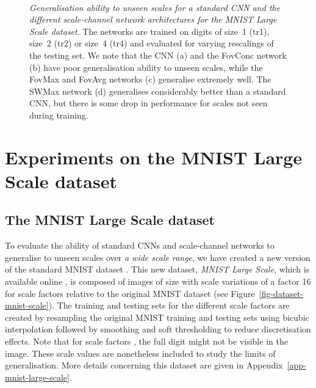 \documentclass[twocolumn,runningheads]{svjour3}
\begin{document}
\begin{figure*}[h]
	\centering
 \\
\vspace*{-1em}
	\caption{{\em Generalisation ability to unseen scales for a
            standard CNN and the different scale-channel network
            architectures for the MNIST Large Scale dataset\/}. The networks are trained on digits of
          size~1 (tr1), size~2 (tr2) or size~4 (tr4) and evaluated
          for varying rescalings of the testing set. We note that the CNN
          (a) and the FovConc network (b) have poor generalisation
          ability to unseen scales, while the FovMax and FovAvg
          networks (c) generalise extremely well. The SWMax network
          (d) generalises considerably better than a standard CNN, but
          there is some drop in performance for scales not seen during
          training.}
	\label{fig-single-scale-generalisation}
\end{figure*}


\section{Experiments on the MNIST Large Scale dataset}
\label{sec-exp-MNISTLargeScale}

\subsection{The MNIST Large Scale dataset}
\label{sec-mnist-scale}

To evaluate the ability of standard CNNs and  scale-channel networks
to generalise to unseen scales over {\em a wide scale range\/}, we have
created a new version of the standard MNIST dataset
\cite{LecBotBenHaf98-ProcIEEE}. 
This new dataset, {\em MNIST Large Scale\/}, which is available online
\cite{JanLin20-MNISTLargeScale}, is composed of images of size 
  with scale variations of a factor 16 for 
scale factors  relative to the original MNIST dataset  
(see Figure~\ref{fig-dataset-mnist-scale}). 
The training and testing sets for the different scale factors are created
by resampling the original MNIST training and testing sets using bicubic
interpolation followed by smoothing and soft thresholding to reduce
discretisation effects. Note that for scale factors , the full
digit might not be visible in the image. These scale values are
nonetheless included to study the limits of generalisation. More
details concerning this dataset are given in
Appendix~\ref{app-mnist-large-scale}.
\end{document}
